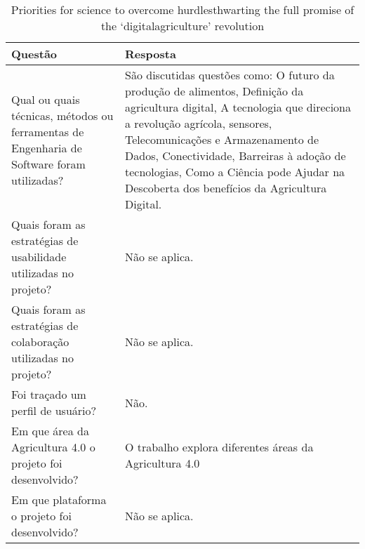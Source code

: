 \documentclass[12pt]{article}
\begin{document}
\begin{table}[!htb]
	\footnotesize
  \centering
	\begin{tabular}{|p{8cm}|p{6cm}|}
		\hline
		\textbf{Questão}                                                                           & \textbf{Resposta}                                                      \\ \hline
		Qual ou quais técnicas, métodos ou ferramentas de Engenharia de Software foram utilizadas? & São discutidas questões como: O futuro da produção de alimentos, Definição da agricultura digital, A tecnologia que direciona a revolução agrícola, sensores, Telecomunicações e Armazenamento de Dados, Conectividade, Barreiras à adoção de tecnologias, Como a Ciência pode Ajudar na Descoberta dos benefícios da Agricultura Digital.		\\ \hline
		Quais foram as estratégias de usabilidade utilizadas no projeto?                           & Não se aplica.                                 \\ \hline
		Quais foram as estratégias de colaboração utilizadas no projeto?                           & Não se aplica.                                 \\ \hline
		Foi traçado um perfil de usuário?                                                          & Não.                                                                \\ \hline
		Em que área da Agricultura 4.0 o projeto foi desenvolvido?                                 & O trabalho explora diferentes áreas da Agricultura 4.0                                    \\ \hline
		Em que plataforma o projeto foi desenvolvido?                                              & Não se aplica.                                 \\ \hline
		\end{tabular}
  \caption{Priorities for science to overcome hurdlesthwarting the full promise of the ‘digitalagriculture’ revolution}
  \label{tab:extracao3}
\end{table}
\end{document}
